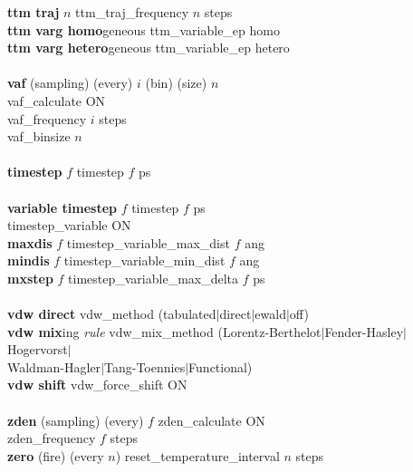 \begin{tabbing}
\>    {\bf ttm traj} $n$ \> ttm\_traj\_frequency $n$ steps \\
\>    {\bf ttm varg homo}geneous \> ttm\_variable\_ep homo \\
\>    {\bf ttm varg hetero}geneous \> ttm\_variable\_ep hetero \\\\
\>    {\bf vaf} (sampling) (every) $i$ (bin) (size) $n$ \\
\> \> vaf\_calculate ON \\
\> \> vaf\_frequency $i$ steps \\
\> \> vaf\_binsize $n$ \\\\
\>    {\bf timestep} $f$ \> timestep $f$ ps \\\\
\>    {\bf variable timestep} $f$ \> timestep $f$ ps \\
\> \> timestep\_variable ON \\
\>    {\bf maxdis} $f$ \> timestep\_variable\_max\_dist $f$ ang \\
\>    {\bf mindis} $f$ \> timestep\_variable\_min\_dist $f$ ang \\
\>    {\bf mxstep} $f$ \> timestep\_variable\_max\_delta $f$ ps \\\\
\>    {\bf vdw direct} \> vdw\_method (tabulated$|$direct$|$ewald$|$off) \\
\>    {\bf vdw mix}ing {\em rule} \> vdw\_mix\_method (Lorentz-Berthelot$|$Fender-Hasley$|$Hogervorst$|$ \\
\> \> \phantom{xxxxxxxxxxxxxxxxxx}Waldman-Hagler$|$Tang-Toennies$|$Functional) \\
\>    {\bf vdw shift} \> vdw\_force\_shift ON \\\\
\>    {\bf zden} (sampling) (every) $f$ \> zden\_calculate ON \\
\> \> zden\_frequency $f$ steps \\
\>    {\bf zero} (fire) (every $n$) \> reset\_temperature\_interval $n$ steps \\\\
\\
\end{tabbing}
